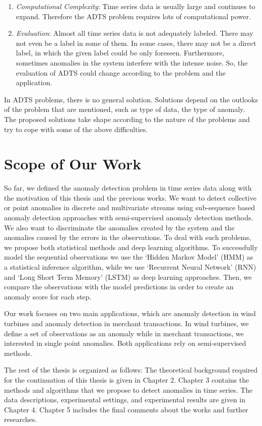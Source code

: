 \begin{enumerate}
    \item {\it Computational Complexity}: 
    Time series data is usually large and continues to expand. 
    Therefore the ADTS problem requires lots of computational power.
    
    \item {\it Evaluation}:
    Almost all time series data is not adequately labeled.
    There may not even be a label in some of them.
    In some cases, there may not be a direct label, in which the given label could be only foreseen.
    Furthermore, sometimes anomalies in the system interfere with the intense noise.
    So, the evaluation of ADTS could change according to the problem and the application.
    
\end{enumerate}

In ADTS problems, there is no general solution. Solutions depend on the outlooks of the problem that are mentioned, such as type of data, the type of anomaly.
The proposed solutions take shape according to the nature of the problems and try to cope with some of the above difficulties.

\section{Scope of Our Work}

So far, we defined the anomaly detection problem in time series data along with the motivation of this thesis and the previous works.
We want to detect collective or point anomalies in discrete and multivariate streams using sub-sequence based anomaly detection approaches with semi-supervised anomaly detection methods. 
We also want to discriminate the anomalies created by the system and the anomalies caused by the errors in the observations.
To deal with such problems, we propose both statistical methods and deep learning algorithms. 
To successfully model the sequential observations we use the `Hidden Markov Model' (HMM) as a statistical inference algorithm, while we use `Recurrent Neural Network' (RNN) and `Long Short Term Memory' (LSTM) as deep learning approaches. 
Then, we compare the observations with the model predictions in order to create an anomaly score for each step.

Our work focuses on two main applications, which are anomaly detection in wind turbines and anomaly detection in merchant transactions. In wind turbines, we define a set of observations as an anomaly while in merchant transactions, we interested in single point anomalies. Both applications rely on semi-supervised methods.

The rest of the thesis is organized as follows: 
The theoretical background required for the continuation of this thesis is given in Chapter 2.
Chapter 3 contains the methods and algorithms that we propose to detect anomalies in time series.
The data descriptions, experimental settings, and experimental results are given in Chapter 4.
Chapter 5 includes the final comments about the works and further researches.